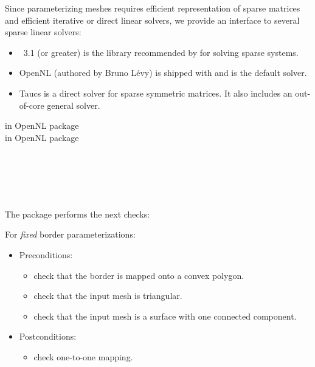 
Since parameterizing meshes requires
efficient representation of sparse matrices and efficient iterative or
direct linear solvers, we provide an interface to several
sparse linear solvers:
\begin{itemize}
\item \eigen\ 3.1 (or greater) is the library recommended by \cgal for solving sparse systems.
\item
    OpenNL (authored by Bruno L{\'e}vy) is shipped with \cgal and is the default solver.
\item
    {\sc Taucs} is a direct solver for sparse symmetric matrices.
    It also includes an out-of-core general solver.
\end{itemize}

 in OpenNL package  \\
 in OpenNL package  \\
  \\
  \\
  \\



  \\



The package performs the next checks:

For \emph{fixed} border parameterizations:
\begin{itemize}
\item Preconditions:
    \begin{itemize}
    \item check that the border is mapped onto a convex polygon.
    \item check that the input mesh is triangular.
    \item check that the input mesh is a surface with one connected component.
    \end{itemize}
\item Postconditions:
    \begin{itemize}
    \item check one-to-one mapping.
    \end{itemize}
\end{itemize}

